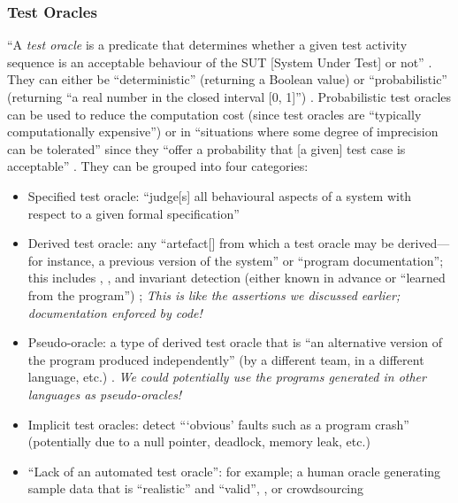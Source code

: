 \subsubsection{Test Oracles}
``A \emph{test oracle} is a predicate that determines whether a given test
activity sequence is an acceptable behaviour of the SUT [System Under Test] or
not'' \citep[p.~509]{BarrEtAl2015}. They can either be ``deterministic''
(returning a Boolean value) or ``probabilistic'' (returning ``a real number in
the closed interval [0, 1]'') \citep[p.~509]{BarrEtAl2015}. Probabilistic
test oracles can be used to reduce the computation cost (since test oracles
are ``typically computationally expensive'') \citep[p.~509]{BarrEtAl2015}
or in ``situations where some degree of imprecision can be tolerated'' since
they ``offer a probability that [a given] test case is acceptable''
\citep[p.~510]{BarrEtAl2015}. They can be grouped into four categories:

\begin{itemize}
      \item Specified test oracle: ``judge[s] all behavioural aspects of a
            system with respect to a given formal specification''
            \citep[p.~510]{BarrEtAl2015}
      \item Derived test oracle: any ``artefact[] from which a
            test oracle may be derived---for instance, a previous version of
            the system'' or ``program documentation''; this includes
            ,
            \citep[p.~510]{BarrEtAl2015}, and invariant detection (either
            known in advance or ``learned from the program'')
            \citep[p.~516]{BarrEtAl2015}; \emph{This is like the assertions
                  we discussed earlier; documentation enforced by code!}
      \item Pseudo-oracle: a type of derived test oracle that is ``an
            alternative version of the program produced independently'' (by a
            different team, in a different language, etc.)
            \citep[p.~515]{BarrEtAl2015}. \emph{We could potentially use the
                  programs generated in other languages as pseudo-oracles!}
      \item Implicit test oracles: detect ```obvious' faults such as a program
            crash'' (potentially due to a null pointer, deadlock, memory leak,
            etc.) \citep[p.~510]{BarrEtAl2015}
      \item ``Lack of an automated test oracle'': for example; a human oracle
            generating sample data that is ``realistic'' and ``valid'',
            \citep[pp.~510-511]{BarrEtAl2015}, or crowdsourcing
            \citep[p.~520]{BarrEtAl2015}
\end{itemize}

